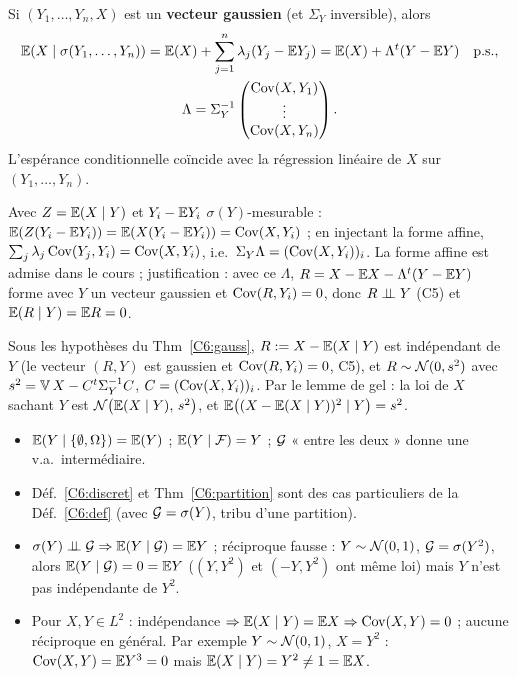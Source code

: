 \documentclass[11pt,a4paper]{article}
\begin{document}
\begin{theoreme}\label{C6:gauss}
Si $(Y_1,\dots,Y_n,X)$ est un \textbf{vecteur gaussien} (et $\Sigma_Y$ inversible), alors
\begin{gather*}\mathbb{E}(X\mid\sigma(Y_1,\dots,Y_n))=\mathbb{E}(X)+\sum_{j=1}^n\lambda_j(Y_j-\mathbb{E} Y_j)=\mathbb{E}(X)+\Lambda^t(Y-\mathbb{E} Y)\quad\text{p.s.},\\
\Lambda=\Sigma_Y^{-1}\begin{pmatrix}\operatorname{Cov}(X,Y_1)\\\vdots\\\operatorname{Cov}(X,Y_n)\end{pmatrix}.\end{gather*}
L'espérance conditionnelle coïncide avec la régression linéaire de $X$ sur $(Y_1,\dots,Y_n)$.
\end{theoreme}
\begin{idee}
Avec $Z=\mathbb{E}(X\mid Y)$ et $Y_i-\mathbb{E} Y_i$ $\sigma(Y)$-mesurable : $\mathbb{E}(Z(Y_i-\mathbb{E} Y_i))=\mathbb{E}(X(Y_i-\mathbb{E} Y_i))=\operatorname{Cov}(X,Y_i)$ ; en injectant la forme
affine, $\sum_j\lambda_j\operatorname{Cov}(Y_j,Y_i)=\operatorname{Cov}(X,Y_i)$, i.e.\ $\Sigma_Y\Lambda=(\operatorname{Cov}(X,Y_i))_i$. La forme affine est admise dans le cours ; justification : avec ce $\Lambda$, $R=X-\mathbb{E} X-\Lambda^t(Y-\mathbb{E} Y)$ forme avec $Y$ un vecteur gaussien et $\operatorname{Cov}(R,Y_i)=0$, donc $R\perp\!\!\!\perp Y$ (C5) et $\mathbb{E}(R\mid Y)=\mathbb{E} R=0$.
\end{idee}

\begin{horscours}\label{C6:gauss-loi}
Sous les hypothèses du Thm~\ref{C6:gauss}, $R:=X-\mathbb{E}(X\mid Y)$ est indépendant de $Y$ (le vecteur $(R,Y)$ est gaussien et
$\operatorname{Cov}(R,Y_i)=0$, C5), et $R\sim\mathcal{N}(0,s^2)$ avec $s^2=\operatorname{\mathbb{V}} X-C^t\Sigma_Y^{-1}C$, $C=(\operatorname{Cov}(X,Y_i))_i$.
Par le lemme de gel : la loi de $X$ sachant $Y$ est $\mathcal{N}\bigl(\mathbb{E}(X\mid Y),\,s^2\bigr)$, et $\mathbb{E}\bigl((X-\mathbb{E}(X\mid Y))^2\mid Y\bigr)=s^2$.
\end{horscours}

\begin{liens}
\begin{itemize}
  \item $\mathbb{E}(Y\mid\{\emptyset,\Omega\})=\mathbb{E}(Y)$ ; $\mathbb{E}(Y\mid\mathcal{F})=Y$ ; $\mathcal{G}$ « entre les deux » donne une v.a.\ intermédiaire.
  \item Déf.~\ref{C6:discret} et Thm~\ref{C6:partition} sont des cas particuliers de la Déf.~\ref{C6:def} (avec $\mathcal{G}=\sigma(Y)$,
  tribu d'une partition).
  \item $\sigma(Y)\perp\!\!\!\perp\mathcal{G}\Rightarrow\mathbb{E}(Y\mid\mathcal{G})=\mathbb{E} Y$ ; réciproque fausse : $Y\sim\mathcal{N}(0,1)$, $\mathcal{G}=\sigma(Y^2)$, alors
  $\mathbb{E}(Y\mid\mathcal{G})=0=\mathbb{E} Y$ ($(Y,Y^2)$ et $(-Y,Y^2)$ ont même loi) mais $Y$ n'est pas indépendante de $Y^2$.
  \item Pour $X,Y\in L^2$ : indépendance $\Rightarrow\mathbb{E}(X\mid Y)=\mathbb{E} X\Rightarrow\operatorname{Cov}(X,Y)=0$ ; aucune réciproque en général. Par exemple $Y\sim\mathcal{N}(0,1)$, $X=Y^2$ : $\operatorname{Cov}(X,Y)=\mathbb{E} Y^3=0$ mais $\mathbb{E}(X\mid Y)=Y^2\neq1=\mathbb{E} X$.
\end{itemize}
\end{liens}
\end{document}
